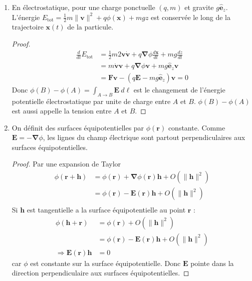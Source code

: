 \begin{enumerate}
\begin{proof}
Si $A=B$, il suit que le travail pour déplacer une charge $q$ le long d'une courbe fermée est nul. Ceci implique que $q\boldsymbol{E}$ est une force conservative.  
\end{proof}
\item En électrostatique, pour une charge ponctuelle $(q,m)$ et gravite $g\boldsymbol{\hat{e}}_{z}$. L'énergie $E_{\mathrm{tot}}=\frac{1}{2}m\lVert \boldsymbol{v} \rVert^{2}+q\phi(\boldsymbol{x})+mgz$ est conservée le long de la trajectoire $\boldsymbol{x}(t)$ de la particule.
\begin{proof}
\begin{align*}
\frac{d}{dt}E_{\mathrm{ t ot}} & =\frac{1}{2}m2\boldsymbol{v}\dot{\boldsymbol{v}}+q\boldsymbol{\nabla}\phi   \frac{d\boldsymbol{x}}{dt}+mg  \frac{dz}{dt} \\
 & =m \dot{\boldsymbol{v}}\boldsymbol{v} +q\boldsymbol{\nabla}\phi \boldsymbol{v}+mg\boldsymbol{\hat{e}}_{z}\boldsymbol{v} \\
 & =\boldsymbol{F}\boldsymbol{v}-(q\boldsymbol{E}-mg\boldsymbol{\hat{e}}_{z})\boldsymbol{v}=0
\end{align*}
Donc $\phi(B)-\phi(A)=\int _{A\to B}\boldsymbol{E}~d\boldsymbol{\ell}$ est le changement de l'énergie potentielle électrostatique par unite de charge entre $A$ et $B$.  $\phi(B)-\phi(A)$ est aussi appelle la tension entre $A$ et $B$.
\end{proof}
\item On définit des surfaces équipotentielles par $\phi(\boldsymbol{r})$ constante. Comme $\boldsymbol{E}=-\boldsymbol{\nabla}\phi$, les lignes du champ électrique sont partout perpendiculaires aux surfaces équipotentielles.
\begin{proof}
Par une expansion de Taylor 
\begin{align*}
\phi(\boldsymbol{r}+\boldsymbol{h}) & =\phi(\boldsymbol{r})+\boldsymbol{\nabla}\phi(\boldsymbol{r})\boldsymbol{h}+O(\lVert \boldsymbol{h} \rVert ^{2}) \\
 & =\phi(\boldsymbol{r})-\boldsymbol{E}(\boldsymbol{r})\boldsymbol{h}+O(\lVert \boldsymbol{h} \rVert ^{2})  \\
\end{align*}
Si $\boldsymbol{h}$ est tangentielle a la surface équipotentielle au point $\boldsymbol{r}$ : 
\begin{align*}
\phi(\boldsymbol{h}+\boldsymbol{r}) & =\phi(\boldsymbol{r})+O(\lVert \boldsymbol{h} \rVert ^{2}) \\
 & =\phi(\boldsymbol{r})-\boldsymbol{E}(\boldsymbol{r})\boldsymbol{h}+O(\lVert \boldsymbol{h} \rVert ^{2}) \\
 \Rightarrow \boldsymbol{E}(\boldsymbol{r})\boldsymbol{h} & =0
\end{align*}
car $\phi$ est constante sur la surface équipotentielle. Donc $\boldsymbol{E}$ pointe dans la direction perpendiculaire aux surfaces équipotentielles. 
\end{proof}
\end{enumerate}

